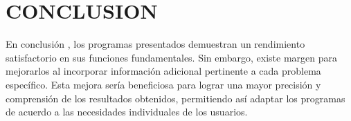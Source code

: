 \documentclass{IEEEcsmag}
\begin{document}
\clearpage


\clearpage


\clearpage


\clearpage


\clearpage


\clearpage


\clearpage


\section{CONCLUSION}
En conclusión , los programas presentados demuestran un rendimiento satisfactorio en sus funciones fundamentales. Sin embargo, existe margen para mejorarlos al incorporar información adicional pertinente a cada problema específico. Esta mejora sería beneficiosa para lograr una mayor precisión y comprensión de los resultados obtenidos, permitiendo así adaptar los programas de acuerdo a las necesidades individuales de los usuarios.
\vspace*{-8pt}


\def\refname{REFERENCES}
\end{document}

